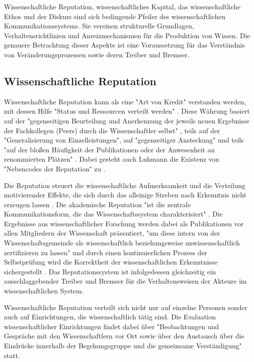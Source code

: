Wissenschaftliche Reputation, wissenschaftliches Kapital, das wissenschaftliche Ethos und der Diskurs sind sich bedingende Pfeiler des wissenschaftlichen Kommunikationssystems. Sie vereinen strukturelle Grundlagen, Verhaltensrichtlinien und Anreizmechanismen für die Produktion von Wissen. Die genauere Betrachtung dieser Aspekte ist eine Voraussetzung für das Verständnis von Veränderungsprozessen sowie deren Treiber und Bremser.

\subsection{Wissenschaftliche Reputation}

Wissenschaftliche Reputation kann als eine "Art von Kredit" \cite{luhmann_1970_selbststeuerung} verstanden werden, mit dessen Hilfe "Status und Ressourcen verteilt werden" \cite{hanekop_2006}. Diese Währung basiert auf der "gegenseitigen Beurteilung und Anerkennung der jeweils neuen Ergebnisse der Fachkollegen (Peers) durch die Wissenschaftler selbst" \cite{Hanekop_2014} \cite{Neidhardt_2006}, teils auf der "Generalisierung von Einzelleistungen", auf "gegenseitiger Ansteckung" und teils "auf der bloßen Häufigkeit der Publikationen oder der Anwesenheit an renommierten Plätzen" \cite{luhmann_1970_selbststeuerung}. Dabei gesteht auch Luhmann die Existenz von "Nebencodes der Reputation" zu \cite{schmoch_2003_hochschulforschung}.

Die Reputation steuert die wissenschaftliche Aufmerksamkeit und die Verteilung motivierender Effekte, die sich durch das alleinige Streben nach Erkenntnis nicht erzeugen lassen \cite{Luhmann1998}. Die akademische Reputation "ist die zentrale Kommunikationsform, die das Wissenschaftssystem charakterisiert" \cite{Rutenfranz_1997}. Die Ergebnisse aus wissenschaftlicher Forschung werden dabei als Publikationen vor allen Mitgliedern der Wissenschaft präsentiert, "um diese intern von der Wissenschaftsgemeinde als wissenschaftlich beziehungsweise unwissenschaftlich zertifizieren zu lassen" \cite{Rutenfranz_1997} und durch einen kontinuierlichen Prozess der Selbstprüfung wird die Korrektheit der wissenschaftlichen Erkenntnisse sichergestellt \cite{edsall_1976_scientific}. Das Reputationssystem ist infolgedessen gleichzeitig ein ausschlaggebender Treiber und Bremser für die Verhaltensweisen der Akteure im wissenschaftlichen System.

Wissenschaftliche Reputation verteilt sich nicht nur auf einzelne Personen sonder auch auf Einrichtungen, die wissenschaftlich tätig sind. Die Evaluation wissenschaftlicher Einrichtungen findet dabei über "Beobachtungen und Gespräche mit den Wissenschaftlern vor Ort sowie über den Austausch über die Eindrücke innerhalb der Begehungsgruppe und die gemeinsame Verständigung" \cite{Barl_sius_2008} statt.

